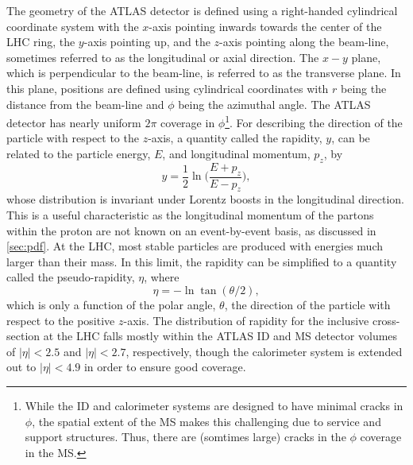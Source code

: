 The geometry of the ATLAS detector is defined using a 
right-handed cylindrical coordinate system with the $x$-axis
pointing inwards towards the center of the LHC ring, the $y$-axis pointing
up, and the $z$-axis pointing along the beam-line, sometimes referred
to as the longitudinal or axial direction.
The $x-y$ plane, which is perpendicular to the beam-line,
is referred to as the transverse plane. In this plane, positions are  
defined using cylindrical coordinates with $r$ being the distance
from the beam-line and $\phi$ being the azimuthal angle.
The ATLAS detector has nearly uniform $2\pi$ 
coverage in $\phi$\footnote{While the ID and calorimeter systems are designed
to have minimal cracks in $\phi$, the
spatial extent of the MS makes this challenging due to service
and support structures. Thus, there are (somtimes large) 
cracks in the $\phi$ coverage in the MS.}.
For describing the direction of the particle with respect 
to the $z$-axis, a quantity called the rapidity, $y$,
can be related to the particle energy, $E$, and longitudinal momentum, $p_z$, 
by
\begin{equation}
y = \frac{1}{2} \ln \Bigg(\frac{E+p_z}{E-p_z} \Bigg),
\end{equation}
whose distribution is invariant under Lorentz boosts in the longitudinal direction.
This is a useful characteristic as the longitudinal momentum of the
partons within the proton are not known on an 
event-by-event basis, as discussed in \sec\ref{sec:pdf}.
At the LHC, most stable particles 
are produced with energies much larger than their mass.
In this limit, 
the rapidity can be simplified to a quantity called the pseudo-rapidity, $\eta$,
where
\begin{equation}
\eta = -\ln \tan (\theta/2) ,
\label{eq:pseudorapidity}
\end{equation}
which is only a function of the polar angle, $\theta$, 
the direction of the particle with respect to the positive $z$-axis.
The distribution of rapidity for the inclusive cross-section
at the LHC falls mostly within the ATLAS ID and MS detector volumes 
of $|\eta| < 2.5$ and $|\eta| < 2.7$, respectively, 
though the calorimeter system is extended out to $|\eta| < 4.9$
in order to ensure good coverage.

